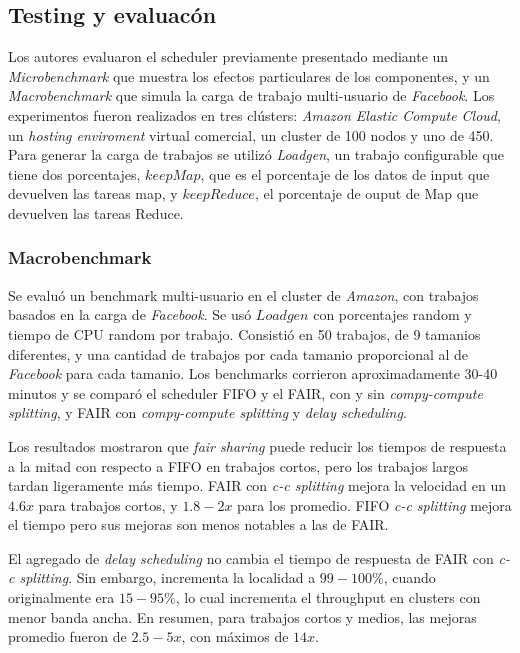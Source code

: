 \subsection{Testing y evaluac\'on}

Los autores evaluaron el scheduler previamente presentado mediante un \emph{Microbenchmark} que muestra los efectos particulares de los componentes, y un \emph{Macrobenchmark} que simula la carga de trabajo multi-usuario de \emph{Facebook}. Los experimentos fueron realizados en tres cl\'usters: \emph{Amazon Elastic Compute Cloud}, un \emph{hosting enviroment} virtual comercial, un cluster de 100 nodos y uno de 450. Para generar la carga de trabajos se utiliz\'o \emph{Loadgen}, un trabajo configurable que tiene dos porcentajes, $keepMap$, que es el porcentaje de los datos de input que devuelven las tareas map, y $keepReduce$, el porcentaje de ouput de Map que devuelven las tareas Reduce.

\subsubsection{Macrobenchmark}

Se evalu\'o un benchmark multi-usuario en el cluster de \emph{Amazon}, con trabajos basados en la carga de \emph{Facebook}. Se us\'o $Loadgen$ con porcentajes random y tiempo de CPU random por trabajo. Consisti\'o en 50 trabajos, de 9 tamanios diferentes, y una cantidad de trabajos por cada tamanio proporcional al de \emph{Facebook} para cada tamanio. Los benchmarks corrieron aproximadamente 30-40 minutos y se compar\'o el scheduler FIFO y el FAIR, con y sin \emph{compy-compute splitting}, y FAIR con \emph{compy-compute splitting} y \emph{delay scheduling}.

\vspace{2mm}

Los resultados mostraron que \emph{fair sharing} puede reducir los tiempos de respuesta a la mitad con respecto a FIFO en trabajos cortos, pero los trabajos largos tardan ligeramente m\'as tiempo. FAIR con \emph{c-c splitting} mejora la velocidad en un $4.6x$ para trabajos cortos, y $1.8-2x$ para los promedio. FIFO \emph{c-c splitting} mejora el tiempo pero sus mejoras son menos notables a las de FAIR.

\vspace{2mm}

El agregado de \emph{delay scheduling} no cambia el tiempo de respuesta de FAIR con \emph{c-c splitting}. Sin embargo, incrementa la localidad a $99-100\%$, cuando originalmente era $15-95\%$, lo cual incrementa el throughput en clusters con menor banda ancha. En resumen, para trabajos cortos y medios, las mejoras promedio fueron de $2.5-5x$, con m\'aximos de $14x$.

